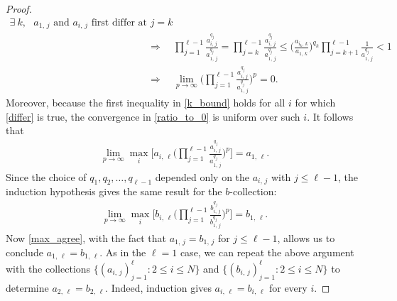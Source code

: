 \documentclass[11pt,reqno]{amsart}
\numberwithin{equation}{section}
\theoremstyle{definition}
\begin{document}
\begin{proof}
\begin{align}
\exists\ k,\text{ $a_{1,\, j}$ and $a_{i,\, j}$ first differ at $j = k$} \label{differ} \\
&\Rightarrow \quad
 \prod_{j = 1}^{\ell-1} \frac{a_{i,\, j}^{q_j}}{a_{1,\, j}^{q_j}}
 =  \prod_{j = k}^{\ell-1} \frac{a_{i,\, j}^{q_j}}{a_{1,\, j}^{q_j}}
\leq \Big(\frac{a_{i_k,\, k}}{a_{1,\, k}}\Big)^{q_k} \prod_{j = k+1}^{\ell-1} \frac{1}{a_{1,\, j}^{q_j}} < 1 \label{k_bound} \\
&\Rightarrow \quad \lim_{p \to \infty} \bigg(\prod_{j = 1}^{\ell-1} \frac{a_{i,\, j}^{q_j}}{a_{1,\, j}^{q_j}}\bigg)^p = 0. \label{ratio_to_0}
\end{align}
Moreover, because the first inequality in \eqref{k_bound} holds for all $i$ for which \eqref{differ} is true, the convergence in \eqref{ratio_to_0} is uniform over such $i$.
It follows that
{\begin{align*} {
\lim_{p \to \infty} \max_{i} \Bigg[a_{i,\, \ell} \bigg(\prod_{j = 1}^{\ell-1} \frac{a_{i,\, j}^{q_j}}{a_{1,\, j}^{q_j}}\bigg)^p\Bigg] = a_{1,\, \ell}.
} \end{align*}}
Since the choice of $q_1,q_2,\dots,q_{\ell-1}$ depended only on the $a_{i,\, j}$ with $j \leq \ell-1$, the induction hypothesis gives the same result for the $b$-collection:
{\begin{align*} {
\lim_{p \to \infty} \max_{i} \Bigg[b_{i,\, \ell}\bigg(\prod_{j = 1}^{\ell-1} \frac{b_{i,\, j}^{q_j}}{b_{1,\, j}^{q_j}}\bigg)^p\Bigg] = b_{1,\, \ell}.
} \end{align*}}
Now \eqref{max_agree}, with the fact that $a_{1,\, j} = b_{1,\, j}$ for $j \leq \ell-1$, allows us to conclude $a_{1,\, \ell} = b_{1,\, \ell}$.
As in the $\ell = 1$ case, we can repeat the above argument with the collections $\{(a_{i,\, j})_{j = 1}^\ell : 2 \leq i \leq N\}$ and $\{(b_{i,\, j})_{j = 1}^\ell : 2 \leq i \leq N\}$ to determine $a_{2,\, \ell} = b_{2,\, \ell}$.
Indeed, induction gives $a_{i,\, \ell} = b_{i,\, \ell}$ for every $i$.
\end{proof}
\end{document}
